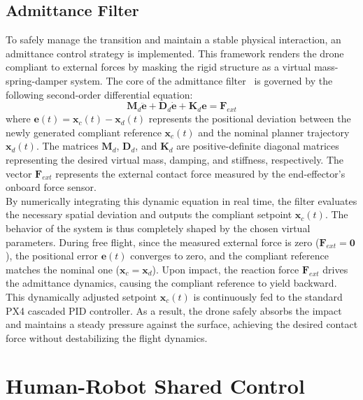 \subsection{Admittance Filter}
To safely manage the transition and maintain a stable physical interaction, an admittance control strategy is implemented. This framework renders the drone compliant to external forces by masking the rigid structure as a virtual mass-spring-damper system. The core of the admittance filter~\cite{siciliano2008springer} is governed by the following second-order differential equation:
\begin{equation}
    \mathbf{M}_d \ddot{\mathbf{e}} + \mathbf{D}_d \dot{\mathbf{e}} + \mathbf{K}_d \mathbf{e} = \mathbf{F}_{ext}
\end{equation}
where $\mathbf{e}(t) = \mathbf{x}_c(t) - \mathbf{x}_d(t)$ represents the positional deviation between the newly generated compliant reference $\mathbf{x}_c(t)$ and the nominal planner trajectory $\mathbf{x}_d(t)$. The matrices $\mathbf{M}_d$, $\mathbf{D}_d$, and $\mathbf{K}_d$ are positive-definite diagonal matrices representing the desired virtual mass, damping, and stiffness, respectively. The vector $\mathbf{F}_{ext}$ represents the external contact force measured by the end-effector's onboard force sensor.
\\By numerically integrating this dynamic equation in real time, the filter evaluates the necessary spatial deviation and outputs the compliant setpoint $\mathbf{x}_c(t)$. The behavior of the system is thus completely shaped by the chosen virtual parameters. During free flight, since the measured external force is zero ($\mathbf{F}_{ext} = \mathbf{0}$), the positional error $\mathbf{e}(t)$ converges to zero, and the compliant reference matches the nominal one ($\mathbf{x}_c = \mathbf{x}_d$). Upon impact, the reaction force $\mathbf{F}_{ext}$ drives the admittance dynamics, causing the compliant reference to yield backward. This dynamically adjusted setpoint $\mathbf{x}_c(t)$ is continuously fed to the standard PX4 cascaded PID controller. As a result, the drone safely absorbs the impact and maintains a steady pressure against the surface, achieving the desired contact force without destabilizing the flight dynamics.


\section{Human-Robot Shared Control}
